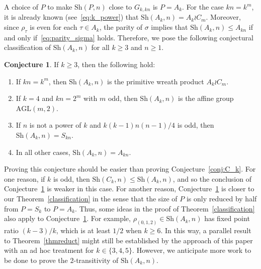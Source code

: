\documentclass[11pt,a4paper,reqno]{amsart}
\newcommand{\A}{A}
\newcommand{\AGL}{\mathrm{AGL}}
\newcommand{\Sh}{\mathrm{Sh}}
\theoremstyle{definition}
\newtheorem{conjecture}[theorem]{Conjecture}
\begin{document}
A choice of $P$ to make $\Sh(P,n)$ close to $G_{k,kn}$ is $P=\A_k$. For the case $kn=k^m$, it is already known (see~\eqref{eq:k_power}) that $\Sh(\A_k,n)=\A_k\wr C_m$. Moreover, since $\rho_\tau$ is even for each $\tau\in \A_k$, the parity of $\sigma$ implies that $\Sh(\A_k,n)\leq A_{kn}$ if and only if~\eqref{eq:parity_sigma} holds. Therefore, we pose the following conjectural classification of $\Sh(\A_k,n)$ for all $k\geq 3$ and $n\geq 1$.
\begin{conjecture}\label{conj:A_k}
  If $k\geq 3$, then the following hold:
    \begin{enumerate}[\rm(a)]
          \item If $kn=k^m$, then $\Sh(\A_k,n)$ is the primitive wreath product $\A_k\wr C_m$.
          \item If $k=4$ and $kn=2^m$ with $m$ odd,  then $\Sh(\A_k,n)$ is the affine group $\AGL(m,2)$.
          \item If $n$ is not a power of $k$ and $k(k-1)n(n-1)/4$ is odd, then $\Sh(\A_k,n)=S_{kn}$.
          \item In all other cases, $\Sh(\A_k,n)=A_{kn}$.
    \end{enumerate}
\end{conjecture}
Proving this conjecture should be easier than proving Conjecture~\ref{conj:C_k}. For one reason, if $k$ is odd, then $\Sh(C_k,n)\leq \Sh(\A_k,n)$, and so the conclusion of Conjecture~\ref{conj:A_k} is weaker in this case. For another reason, Conjecture~\ref{conj:A_k} is closer to our Theorem~\ref{classification} in the sense that the size of $P$ is only reduced by half from $P=S_k$ to $P=A_k$. Thus, some ideas in the proof of Theorem~\ref{classification} also apply to Conjecture~\ref{conj:A_k}. For example, $\rho_{(0,1,2)}\in \Sh(\A_k,n)$ has fixed point ratio $(k-3)/k$, which is at least $1/2$ when $k\geq 6$. In this way, a parallel result to Theorem~\ref{thmreduct} might still be established by the approach of this paper with an ad hoc treatment for $k\in\{3,4,5\}$.
However, we anticipate more work to be done to  prove the $2$-transitivity of $\Sh(\A_k,n)$.
\end{document}
